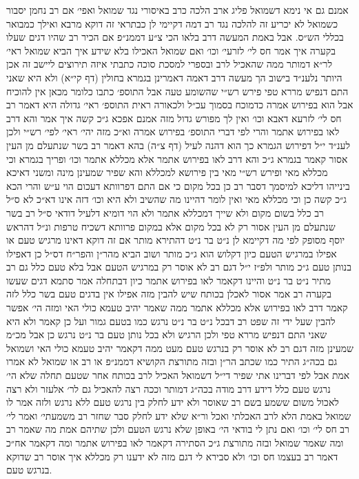 \documentclass[12pt, openany]{book}
\begin{document}
\begin{multicols}{2}
אמנם גם אי נימא דשמואל פליג ארב הלכה כרב באיסורי נגד שמואל ואפי׳ אם רב נחמן יסבור כשמואל לא יכריע זה להלכה נגד רב דמה דקיימי לן כבתראי זה דוקא מרבא ואילך כמבואר בכללי הש״ס. אבל באמת המעשה דרב בלאו הכי צ״ע דממנ״פ אם הכיר רב שהיו דגים שעלו בקערה איך אמר חס לי׳ לזרעי׳ וכו׳ ואם שמואל האכילו בלא שידע איך הביא שמואל ראי׳ לר״א דמותר ממה שהאכיל לרב ובספרי למסכת סוכה כתבתי איזה תירוצים ליישב זה אכן היותר נלענ״ד בישוב הך מעשה דרב דאמה דאמרינן בגמרא בחולין (דף קי״א) ולא היא שאני התם דנפיש מררא טפי פירש רש״י שהשומע טעה אבל התוספ׳ כתבו כלומר מכאן אין להוכיח אבל הוא בפירוש אמרה כדמוכח בסמוך עכ״ל ולכאורה ראית התוספ׳ ראי׳ גדולה היא דאמר רב חס לי׳ לזרעא דאבא וכו׳ ואין לך מפורש גדול מזה אמנם אפכא ג״כ קשה איך אמר והא דרב לאו בפירוש אתמר והרי לפי דברי התוספ׳ בפירוש אמרה וא״כ מזה יהי׳ ראי׳ לפי׳ רש״י ולכן לענ״ד י״ל דפירוש הגמרא כך הוא דהנה לעיל (דף צ״ה) בהא דאמר רב בשר שנתעלם מן העין אסור קאמר בגמרא ג״כ והא דרב לאו בפירוש אתמר אלא מכללא אתמר וכו׳ ופריך בגמרא וכי מכללא מאי ופירש רש״י מאי בין פירושא למכללא והא שפיר שמעינן מינה ומשני דאיכא בינייהו דליכא למיסמך דסבר רב כן בכל מקום כי אם התם דפרוותא דעכום הוי ע״ש והרי הכא ג״כ קשה כן וכי מכללא מאי ואין לומר דהיינו מה שהשיב ולא היא וכו׳ דזה אינו דא״כ לא ס״ל רב כלל בשום מקום ולא שייך דמכללא אתמר ולא הוי דומיא דלעיל דודאי ס״ל רב בשר שנתעלם מן העין אסור רק לא בכל מקום אלא במקום פרוותא דשכיח טרפות ונ״ל דהראש יוסף מסופק לפי מה דקיימא לן נ״ט בר נ״ט דהתירא מותר אם זה דוקא דאינו מרגיש טעם או אפילו במרגיש הטעם כיון דקלוש הוא ג״כ מותר ושוב הביא מהר״ן והפר״ח דס״ל כן דאפילו בנותן טעם ג״כ מותר ולפ״ז י״ל דגם רב לא אוסר רק במרגיש הטעם אבל בלא טעם כלל גם רב מתיר נ״ט בר נ״ט והיינו דקאמר לאו בפירוש אתמר כיון דבתחלה אמר סתמא דגים שעשו בקערה רב אמר אסור לאכלן בכותח שיש להבין מזה אפילו אין בדגים טעם בשר כלל לזה קאמר דרב לאו בפירוש אלא מכללא אתמר ממה שאמר יהיב טעמא כולי האי ומזה הי׳ אפשר להבין שעל ידי זה שפט רב דבכל נ״ט בר נ״ט נרגש כמו בטעם גמור ועל כן קאמר ולא היא שאני התם דנפיש מררא טפי ולכן הרגיש ולא בכל נותן טעם בר נ״ט נרגש כן אבל מכ״מ שמעינן מזה דגם רב לא אוסר רק בנרגש טעם מעט ממה דקאמר יהיב טעמא כולי האי ושמואל גם בכה״ג התיר כמו שכתב הר״ן ובזה מתורצת הקושיא דממנ״פ או רב או שמואל לא אמרו אמת אבל לפי דברינו אתי שפיר די״ל דשמואל האכיל לרב בכותח אחר שטעם תחלה שלא הי׳ נרגש טעם כלל דידע דרב מודה בכה״ג דמותר וככה רצה להאכיל גם לר׳ אלעזר ולא רצה לאכול משום ששמע בשם רב שאוסר ולא ידע לחלק בין נרגש טעם ללא נרגש ולזה אמר לו שמואל באמת הלא לרב האכלתי ואכל ור״א שלא ידע לחלק סבר שחזר רב משמעתי׳ ואמר לי׳ רב חס לי׳ וכו׳ ואם נתן לי בודאי הי׳ באופן שלא נרגש הטעם ולכן שתיהם אמת מה שאמר רב ומה שאמר שמואל ובזה מתורצת ג״כ הסתירה דקאמר לאו בפירוש אתמר ומה דקאמר אח״כ דאמר רב בעצמו חס וכו׳ ולא סבירא לי דגם מזה לא ידענו רק מכללא איך אוסר רב שדוקא בנרגש טעם.\\\vspace{0pt}


\end{multicols}
\end{document}
